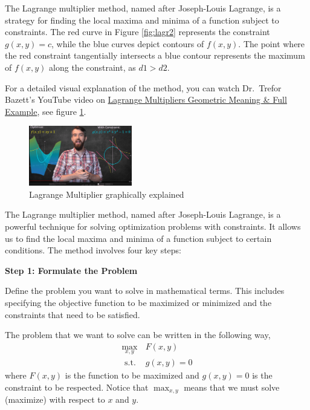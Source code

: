 \documentclass[
  12pt,
  oneside]{book}
\theoremstyle{definition}
\theoremstyle{definition}
\theoremstyle{definition}
\theoremstyle{definition}
\theoremstyle{remark}
\begin{document}
The Lagrange multiplier method, named after Joseph-Louis Lagrange,
is a strategy for finding the local maxima and minima of a function subject to constraints.
The red curve in Figure \ref{fig:lagr2} represents the constraint \(g(x, y) = c\),
while the blue curves depict contours of \(f(x, y)\).
The point where the red constraint tangentially intersects a blue contour
represents the maximum of \(f(x, y)\) along the constraint, as \(d1 > d2\).

For a detailed visual explanation of the method, you can watch Dr.~Trefor Bazett's
YouTube video on \href{https://youtu.be/8mjcnxGMwFo}{Lagrange Multipliers \textbar{} Geometric Meaning \& Full Example}, see figure \ref{fig:lagrange-yt}.

\begin{figure}
\centering
\includegraphics[width=0.4\textwidth,height=\textheight]{fig/lagrange-yt.png}
\caption[\label{fig:lagrange-yt} Lagrange Multiplier graphically explained]{\label{fig:lagrange-yt} Lagrange Multiplier graphically explained\footnotemark{}}
\end{figure}

The Lagrange multiplier method, named after Joseph-Louis Lagrange,
is a powerful technique for solving optimization problems with constraints.
It allows us to find the local maxima and minima of a function subject to certain conditions.
The method involves four key steps:

\textbf{Step 1: Formulate the Problem}

Define the problem you want to solve in mathematical terms.
This includes specifying the objective function to be maximized or minimized and the constraints that need to be satisfied.

The problem that we want to solve can be written in the following way,
\[
\begin{array}{ll}
    \max _{x, y} & F(x, y) \\
    \text{ s.t. } & g(x, y)=0
\end{array}
\]
where \(F(x, y)\) is the function to be maximized and \(g(x, y)=0\) is the constraint to be respected.
Notice that \(\max _{x, y}\) means that we must solve (maximize) with respect to \(x\) and \(y\).
\end{document}

